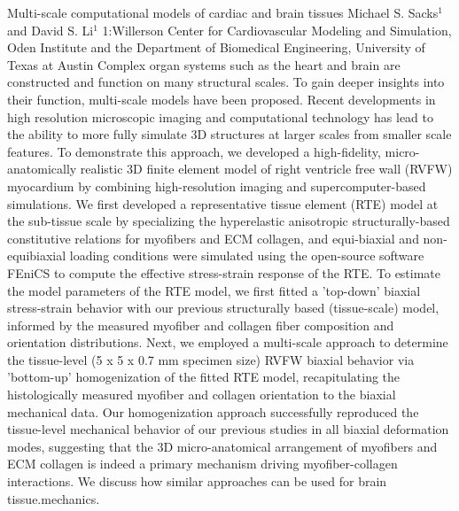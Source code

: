 \begin{addmargin}[2em]{0em}
\vspace{1.5ex}
\abs
{Multi-scale computational models of cardiac and brain tissues}
{Michael S. Sacks$^{1}$ and David S. Li$^{1}$}
{1:Willerson Center for Cardiovascular Modeling and Simulation, Oden Institute and the Department of Biomedical Engineering, University of Texas at Austin }
{Complex organ systems such as the heart and brain are constructed and function on many structural scales.  To gain deeper insights into their function, multi-scale models have been proposed. Recent developments in high resolution microscopic imaging and computational technology has lead to the ability to more fully simulate 3D structures at larger scales from smaller scale features.  To demonstrate this approach, we developed a high-fidelity, micro-anatomically realistic 3D finite element model of right ventricle free wall (RVFW) myocardium by combining high-resolution imaging and supercomputer-based simulations. We first developed a representative tissue element (RTE) model at the sub-tissue scale by specializing the hyperelastic anisotropic structurally-based constitutive relations for myofibers and ECM collagen, and equi-biaxial and non-equibiaxial loading conditions were simulated using the open-source software FEniCS to compute the effective stress-strain response of the RTE. To estimate the model parameters of the RTE model, we first fitted a 'top-down' biaxial stress-strain behavior with our previous structurally based (tissue-scale) model, informed by the measured myofiber and collagen fiber composition and orientation distributions. Next, we employed a multi-scale approach to determine the tissue-level (5 x 5 x 0.7 mm specimen size) RVFW biaxial behavior via 'bottom-up' homogenization of the fitted RTE model, recapitulating the histologically measured myofiber and collagen orientation to the biaxial mechanical data. Our homogenization approach successfully reproduced the tissue-level mechanical behavior of our previous studies in all biaxial deformation modes, suggesting that the 3D micro-anatomical arrangement of myofibers and ECM collagen is indeed a primary mechanism driving myofiber-collagen interactions.  We discuss how similar approaches can be used for brain tissue.mechanics.}



\end{addmargin}
